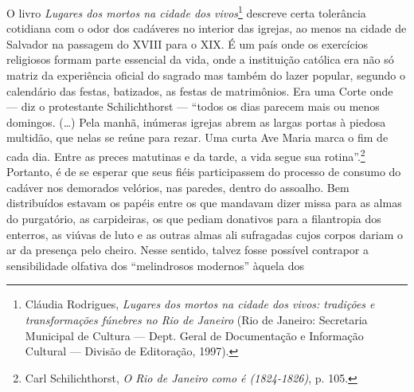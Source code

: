 O livro \textit{Lugares dos mortos na cidade dos vivos}\footnote{Cláudia
  Rodrigues, \textit{Lugares dos mortos na cidade dos vivos: tradições e
  transformações fúnebres no Rio de Janeiro} (Rio de Janeiro: Secretaria
  Municipal de Cultura --- Dept. Geral de Documentação e Informação
  Cultural --- Divisão de Editoração, 1997).} descreve certa tolerância
cotidiana com o odor dos cadáveres no interior das igrejas, ao menos na
cidade de Salvador na passagem do XVIII para o XIX. É um país onde os
exercícios religiosos formam parte essencial da vida, onde a instituição
católica era não só matriz da experiência oficial do sagrado mas também
do lazer popular, segundo o calendário das festas, batizados, as festas
de matrimônios. Era uma Corte onde --- diz o protestante Schilichthorst
--- ``todos os dias parecem mais ou menos domingos. (\ldots{}) Pela
manhã, inúmeras igrejas abrem as largas portas à piedosa multidão, que
nelas se reúne para rezar. Uma curta Ave Maria marca o fim de cada dia.
Entre as preces matutinas e da tarde, a vida segue sua
rotina''.\footnote{Carl Schilichthorst, \textit{O Rio de Janeiro como é
  (1824-1826)}, p. 105.} Portanto, é de se esperar que seus fiéis
participassem do processo de consumo do cadáver nos demorados velórios,
nas paredes, dentro do assoalho. Bem distribuídos estavam os papéis
entre os que mandavam dizer missa para as almas do purgatório, as
carpideiras, os que pediam donativos para a filantropia dos enterros, as
viúvas de luto e as outras almas ali sufragadas cujos corpos dariam o ar
da presença pelo cheiro. Nesse sentido, talvez fosse possível contrapor
a sensibilidade olfativa dos ``melindrosos modernos'' àquela dos
